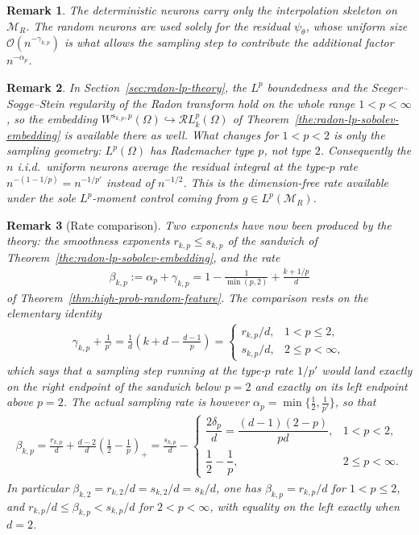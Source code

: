 \documentclass[12pt]{article}
\numberwithin{equation}{section}
\newtheorem{remark}{Remark}
\numberwithin{figure}{section}
\numberwithin{equation}{section}
\newcommand{\MR}{\mathcal M_R}
\begin{document}
\begin{remark}
The deterministic neurons carry only the interpolation skeleton on $\MR$. The
random neurons are used solely for the residual $\psi_\theta$, whose uniform size
$\mathcal O(n^{-\gamma_{k,p}})$ is what allows the sampling step to contribute the additional
factor $n^{-\alpha_p}$.
\end{remark}

\begin{remark}
\label{rem:why-p-ge-2}
In Section~\ref{sec:radon-lp-theory}, the $L^p$
boundedness and the Seeger--Sogge--Stein regularity of the Radon transform hold on the whole range $1<p<\infty$, so the embedding
$W^{s_{k,p},p}(\Omega)\hookrightarrow\mathcal{R}L^p_k(\Omega)$ of
Theorem~\ref{the:radon-lp-sobolev-embedding} is available there as well. What
changes for $1<p<2$ is only the sampling geometry: $L^p(\Omega)$ has Rademacher
type $p$, not type $2$. Consequently the $n$ i.i.d.\ uniform neurons average the
residual integral at the type-$p$ rate $n^{-(1-1/p)}=n^{-1/p'}$ instead of
$n^{-1/2}$. This is the dimension-free rate available under the sole
$L^p$-moment control coming from $g\in L^p(\MR)$.
\end{remark}

\begin{remark}[Rate comparison]
\label{rem:lp-rate-comparison}
Two exponents have now been produced by the theory: the smoothness exponents
$r_{k,p}\le s_{k,p}$ of the sandwich of
Theorem~\ref{the:radon-lp-sobolev-embedding}, and the rate
\begin{align}
    \beta_{k,p}:=\alpha_p+\gamma_{k,p}
    =1-\frac1{\min(p,2)} + \frac{k+1/p}{d}
    \label{eq:rate-exponent}
\end{align}
of Theorem~\ref{thm:high-prob-random-feature}. The comparison rests on the
elementary identity
\begin{align*}
    \gamma_{k,p}+\frac1{p'}
    =\frac1d\left(k+d-\frac{d-1}{p}\right)
    =\begin{cases}
        r_{k,p}/d, & 1<p\le2,\\[1mm]
        s_{k,p}/d, & 2\le p<\infty,
    \end{cases}
\end{align*}
which says that a sampling step running at the type-$p$ rate $1/p'$ would land
exactly on the right endpoint of the sandwich below $p=2$ and exactly on its left
endpoint above $p=2$. The actual sampling rate is however
$\alpha_p=\min\{\tfrac12,\tfrac1{p'}\}$, so that
\begin{align}
    \beta_{k,p}
    =\frac{r_{k,p}}{d}+\frac{d-2}{d}\left(\frac12-\frac1p\right)_+
    =\frac{s_{k,p}}{d}-
    \begin{cases}
        \dfrac{2\delta_p}{d}=\dfrac{(d-1)(2-p)}{pd}, & 1<p<2,\\[2mm]
        \dfrac12-\dfrac1p, & 2\le p<\infty .
    \end{cases}
    \label{eq:rate-vs-sandwich}
\end{align}
In particular $\beta_{k,2}=r_{k,2}/d=s_{k,2}/d=s_k/d$, one has
$\beta_{k,p}=r_{k,p}/d$ for $1<p\le2$, and
$r_{k,p}/d\le\beta_{k,p}<s_{k,p}/d$ for $2<p<\infty$, with equality on the left
exactly when $d=2$.
\end{remark}
\end{document}

